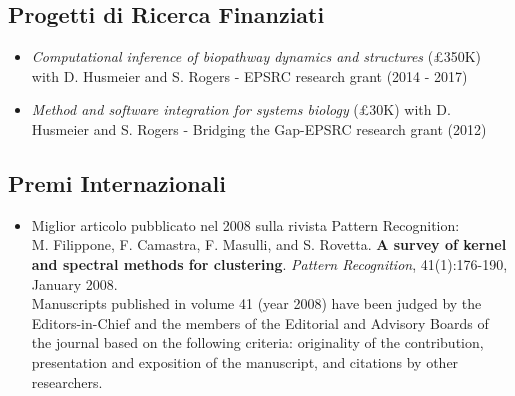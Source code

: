 \documentclass[a4paper,10pt]{article}
\begin{document}

\subsection*{Progetti di Ricerca Finanziati}
\begin{itemize}
  \item \emph{Computational inference of biopathway dynamics and structures} (\pounds 350K) with D. Husmeier and S. Rogers - EPSRC research grant  (2014 - 2017)
  \item \emph{Method and software integration for systems biology} (\pounds 30K) with D. Husmeier and S. Rogers - Bridging the Gap-EPSRC research grant  (2012)
\end{itemize}

\subsection*{Premi Internazionali}
\begin{itemize}
     \item Miglior articolo pubblicato nel 2008 sulla rivista Pattern Recognition:
       \\M. Filippone, F. Camastra, F. Masulli, and S. Rovetta.
       \textbf{A survey of kernel and spectral methods for clustering}.
       \emph{Pattern Recognition}, 41(1):176-190, January 2008.
       \\Manuscripts published in volume 41 (year 2008) have been judged by the Editors-in-Chief and the members of the Editorial and Advisory Boards of the journal based on the following criteria: originality of the contribution, presentation and exposition of the manuscript, and citations by other researchers.
\end{itemize}
\end{document}
